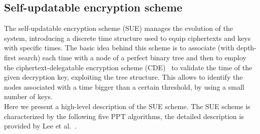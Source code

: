 \documentclass[a4paper,10pt]{article}
\begin{document}
	\subsection{Self-updatable encryption scheme}
The self-updatable encryption scheme (SUE) manages the evolution of the system, introducing a discrete time structure used to equip ciphertexts and keys with specific times. The basic idea behind this scheme is to associate (with depth-first search) each time with a node of a perfect binary tree and then to employ the ciphertext-delegatable encryption scheme (CDE)~\cite{lee2013RSABE} to validate the time of the given decryption key, exploiting the tree structure. This allows to identify the nodes associated with a time bigger than a certain threshold, by using a small number of keys.\\
Here we present  a high-level description of  the SUE scheme.
The SUE scheme is characterized by the following five PPT algorithms, the detailed description is provided by Lee et al.~\cite{lee2013RSABE}.
\end{document}
